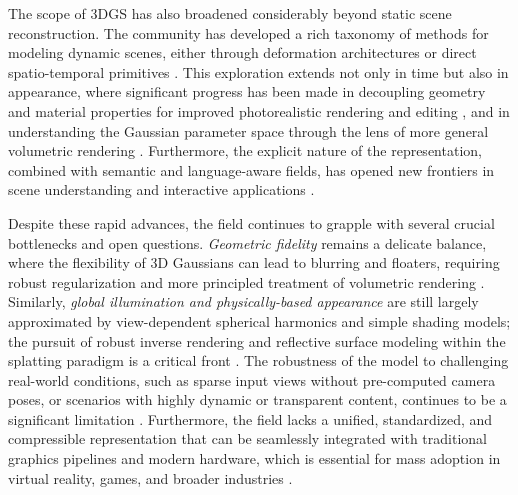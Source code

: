 \documentclass[11pt,a4paper]{article}
\begin{document}
The scope of 3DGS has also broadened considerably beyond static scene reconstruction. The community has developed a rich taxonomy of methods for modeling dynamic scenes, either through deformation architectures \cite{arxiv:2311.12897v1} or direct spatio-temporal primitives \cite{arxiv:2412.20720v2}. This exploration extends not only in time but also in appearance, where significant progress has been made in decoupling geometry and material properties for improved photorealistic rendering and editing \cite{arxiv:2511.18873v1,arxiv:2409.12954v1}, and in understanding the Gaussian parameter space through the lens of more general volumetric rendering \cite{arxiv:2510.18101v1,arxiv:2502.19318v1}. Furthermore, the explicit nature of the representation, combined with semantic and language-aware fields, has opened new frontiers in scene understanding and interactive applications \cite{arxiv:2508.09977v5,arxiv:2402.07181v1}.

Despite these rapid advances, the field continues to grapple with several crucial bottlenecks and open questions. \emph{Geometric fidelity} remains a delicate balance, where the flexibility of 3D Gaussians can lead to blurring and floaters, requiring robust regularization and more principled treatment of volumetric rendering \cite{arxiv:2502.19318v1,arxiv:2411.14974v3}. Similarly, \emph{global illumination and physically-based appearance} are still largely approximated by view-dependent spherical harmonics and simple shading models; the pursuit of robust inverse rendering and reflective surface modeling within the splatting paradigm is a critical front \cite{arxiv:2403.11134v2,arxiv:2512.08334v3}. The robustness of the model to challenging real-world conditions, such as sparse input views without pre-computed camera poses, or scenarios with highly dynamic or transparent content, continues to be a significant limitation \cite{arxiv:2312.07504v1,arxiv:2401.03890v2}. Furthermore, the field lacks a unified, standardized, and compressible representation that can be seamlessly integrated with traditional graphics pipelines and modern hardware, which is essential for mass adoption in virtual reality, games, and broader industries \cite{arxiv:2510.26694v1,arxiv:2502.19457v1,arxiv:2406.12080v1}.
\end{document}
